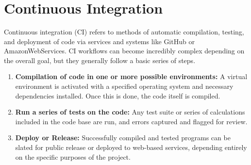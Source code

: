 \section{Continuous Integration}
\paragraph{} Continuous integration (CI) refers to methods of automatic compilation, testing, and deployment of code via services and systems like GitHub or AmazonWebServices.
CI workflows can become incredibly complex depending on the overall goal, but they generally follow a basic series of steps.
\begin{enumerate}
    \item \textbf{Compilation of code in one or more possible environments:} A virtual environment is activated with a specified operating system and necessary dependencies installed.  Once this is done, the code itself is compiled.
    \item \textbf{Run a series of tests on the code:} Any test suite or series of calculations included in the code base are run, and errors captured and flagged for review.
    \item \textbf{Deploy or Release:} Successfully compiled and tested programs can be slated for public release or deployed to web-based services, depending entirely on the specific purposes of the project. 
\end{enumerate}